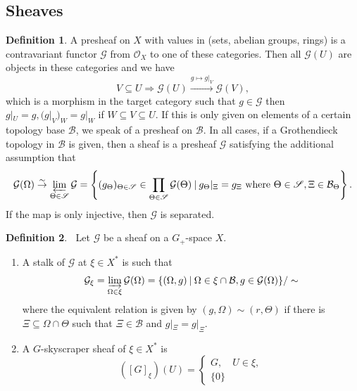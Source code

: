 \documentclass[10pt]{article}
\numberwithin{equation}{section}
\theoremstyle{definition}
\newtheorem{definition}{Definition}[subsection]
\newcommand{\Ouv}{\mathscr{O}}
\newcommand{\sep}[0]{\:|\:}
\newcommand{\sS}[0]{\mathscr{S}}
\newcommand{\cB}[0]{\mathcal{B}}
\newcommand{\cG}[0]{\mathcal{G}}
\begin{document}
\subsection{Sheaves}
\begin{definition}
    \label{definition_10_1}
    A presheaf on $X$ with values in (sets, abelian groups, rings) is a contravariant functor $\mathcal{G}$ from $\Ouv_X$ to one of these categories. Then all $\mathcal{G}(U)$ are objects in these categories and we have
    \begin{equation*}
    V\subseteq U\Rightarrow \mathcal{G}(U)\stackrel{g\mapsto g|_V}{\to}\mathcal{G}(V),
    \end{equation*}
    which is a morphism in the target category such that $g\in\mathcal{G}$ then $g|_U = g,(g|_V)_W=g|_W$ if $W\subseteq V\subseteq U$.
    If this is only given on elements of a certain topology base $\cB$, we speak of a presheaf on $\cB$. In all cases, if a Grothendieck topology in $\cB$ is given, then a sheaf is a presheaf $\mathcal{G}$ satisfying the additional assumption that
    \begin{equation*}
        \mathcal{G}(\Omega)\stackrel{\sim}{\to}\varprojlim_{\Theta\in\sS}\mathcal{G} = \left\{(g_\Theta)_{\Theta\in\sS}\in\prod_{\Theta\in\sS}\mathcal{G}(\Theta)\sep g_\Theta|_{\Xi} = g_\Xi\text{ where $\Theta\in\sS, \Xi\in\cB_\Theta$}\right\}.
    \end{equation*}
    If the map is only injective, then $\cG$ is separated.
\end{definition}

\begin{definition}$\:$
    \label{definition_10_2}
    Let $\mathcal{G}$ be a sheaf on a $G_+$-space $X$.
    \begin{enumerate}
        \item A stalk of $\mathcal{G}$ at $\xi\in X^*$ is such that
        \begin{equation*}
            \mathcal{G}_\xi = \varinjlim_{\Omega\in\xi}\mathcal{G}(\Omega) = \{(\Omega,g)\sep \Omega\in\xi\cap\cB,g\in\mathcal{G}(\Omega)\}/\sim
        \end{equation*}
        where the equivalent relation is given by $(g,\Omega)\sim (r,\Theta)$ if there is $\Xi\subseteq\Omega\cap \Theta$ such that $\Xi\in\cB$ and $g|_{\Xi} = g|_{\Xi}$.
        \item A $G$-skyscraper sheaf of $\xi\in X^*$ is \begin{equation*}
            ([G]_\xi)(U) = \begin{cases}
                G,\quad U\in\xi,\\
                \{0\}
            \end{cases}
        \end{equation*}
    \end{enumerate}
\end{definition}
\end{document}
